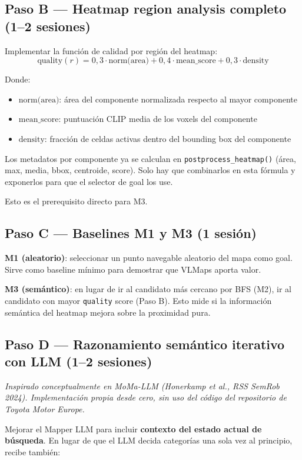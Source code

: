 \documentclass[11pt,a4paper]{article}
\begin{document}
\subsection{Paso B --- Heatmap region analysis completo (1--2 sesiones)}

Implementar la función de calidad por región del heatmap:
\[
  \text{quality}(r) = 0{,}3 \cdot \text{norm(area)} + 0{,}4 \cdot \text{mean\_score}
  + 0{,}3 \cdot \text{density}
\]

Donde:
\begin{itemize}
  \item $\text{norm(area)}$: área del componente normalizada respecto al mayor componente
  \item $\text{mean\_score}$: puntuación CLIP media de los voxels del componente
  \item $\text{density}$: fracción de celdas activas dentro del bounding box del componente
\end{itemize}

Los metadatos por componente ya se calculan en \texttt{postprocess\_heatmap()} (área, max,
media, bbox, centroide, score). Solo hay que combinarlos en esta fórmula y exponerlos
para que el selector de goal los use.

Esto es el prerequisito directo para M3.

\subsection{Paso C --- Baselines M1 y M3 (1 sesión)}

\textbf{M1 (aleatorio)}: seleccionar un punto navegable aleatorio del mapa como goal.
Sirve como baseline mínimo para demostrar que VLMaps aporta valor.

\textbf{M3 (semántico)}: en lugar de ir al candidato más cercano por BFS (M2), ir al
candidato con mayor \texttt{quality} score (Paso B). Esto mide si la información semántica
del heatmap mejora sobre la proximidad pura.

\subsection{Paso D --- Razonamiento semántico iterativo con LLM (1--2 sesiones)}

\textit{Inspirado conceptualmente en MoMa-LLM (Honerkamp et al., RSS SemRob 2024).
Implementación propia desde cero, sin uso del código del repositorio de Toyota Motor Europe.}

Mejorar el Mapper LLM para incluir \textbf{contexto del estado actual de búsqueda}.
En lugar de que el LLM decida categorías una sola vez al principio, recibe también:
\end{document}
